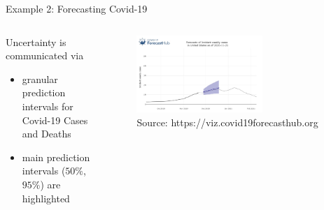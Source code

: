 \documentclass[en]{sdqbeamer}
\begin{document}
\addtocounter{framenumber}{-1}
\begin{frame}[t]{Example 2: Forecasting Covid-19}
\begin{columns}
\begin{column}{0.35\textwidth}
Uncertainty is communicated via \smallskip
    \begin{itemize}
         \item granular prediction intervals for Covid-19 Cases and Deaths \medskip
         \item main prediction intervals ($50\%$, $95\%$) are highlighted
    \end{itemize}
    \vspace{2cm}
\end{column}
\begin{column}{0.65\textwidth}
\vspace*{-.05cm}
    \begin{figure}
        \centering
        \includegraphics[width=0.65\textwidth]{figures_svr/covid19.jpg} 
        \caption{Source: https://viz.covid19forecasthub.org}
    \end{figure}
\end{column}
\end{columns}
\end{frame}
\end{document}
